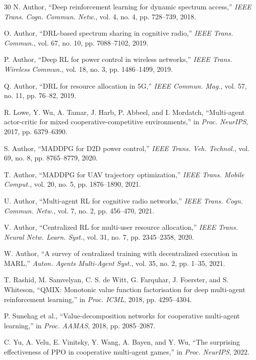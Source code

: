 \documentclass[conference]{IEEEtran}
\begin{document}
\begin{thebibliography}{30}
N. Author, ``Deep reinforcement learning for dynamic spectrum access,'' \emph{IEEE Trans. Cogn. Commun. Netw.}, vol. 4, no. 4, pp. 728--739, 2018.

O. Author, ``DRL-based spectrum sharing in cognitive radio,'' \emph{IEEE Trans. Commun.}, vol. 67, no. 10, pp. 7088--7102, 2019.

P. Author, ``Deep RL for power control in wireless networks,'' \emph{IEEE Trans. Wireless Commun.}, vol. 18, no. 3, pp. 1486--1499, 2019.

Q. Author, ``DRL for resource allocation in 5G,'' \emph{IEEE Commun. Mag.}, vol. 57, no. 11, pp. 76--82, 2019.

R. Lowe, Y. Wu, A. Tamar, J. Harb, P. Abbeel, and I. Mordatch, ``Multi-agent actor-critic for mixed cooperative-competitive environments,'' in \emph{Proc. NeurIPS}, 2017, pp. 6379--6390.

S. Author, ``MADDPG for D2D power control,'' \emph{IEEE Trans. Veh. Technol.}, vol. 69, no. 8, pp. 8765--8779, 2020.

T. Author, ``MADDPG for UAV trajectory optimization,'' \emph{IEEE Trans. Mobile Comput.}, vol. 20, no. 5, pp. 1876--1890, 2021.

U. Author, ``Multi-agent RL for cognitive radio networks,'' \emph{IEEE Trans. Cogn. Commun. Netw.}, vol. 7, no. 2, pp. 456--470, 2021.

V. Author, ``Centralized RL for multi-user resource allocation,'' \emph{IEEE Trans. Neural Netw. Learn. Syst.}, vol. 31, no. 7, pp. 2345--2358, 2020.

W. Author, ``A survey of centralized training with decentralized execution in MARL,'' \emph{Auton. Agents Multi-Agent Syst.}, vol. 35, no. 2, pp. 1--35, 2021.

T. Rashid, M. Samvelyan, C. S. de Witt, G. Farquhar, J. Foerster, and S. Whiteson, ``QMIX: Monotonic value function factorisation for deep multi-agent reinforcement learning,'' in \emph{Proc. ICML}, 2018, pp. 4295--4304.

P. Sunehag et al., ``Value-decomposition networks for cooperative multi-agent learning,'' in \emph{Proc. AAMAS}, 2018, pp. 2085--2087.

C. Yu, A. Velu, E. Vinitsky, Y. Wang, A. Bayen, and Y. Wu, ``The surprising effectiveness of PPO in cooperative multi-agent games,'' in \emph{Proc. NeurIPS}, 2022.


\end{thebibliography}
\end{document}
